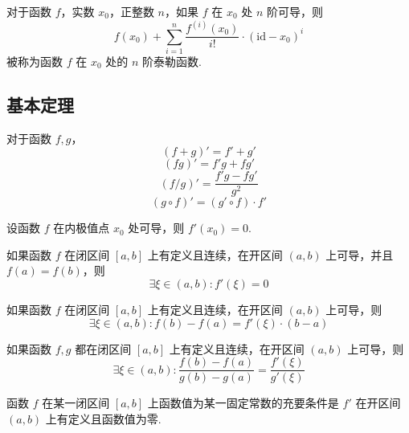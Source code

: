\begin{definition}
    对于函数 $f$，实数 $x_0$，正整数 $n$，如果 $f$ 在 $x_0$ 处 $n$ 阶可导，则
    \[f(x_0) + \sum_{i=1}^{n} \frac{f^{(i)}(x_0)}{i!} \cdot (\mathrm{id} - x_0)^i\]
    被称为函数 $f$ 在 $x_0$ 处的 $n$ 阶泰勒函数.
\end{definition}

\subsection{基本定理}
\begin{theorem}
    对于函数 $f,g$，
    \[(f+g)' = f' + g'\]
    \[(fg)' = f'g + fg'\]
    \[(f/g)' = \frac{f'g - fg'}{g^2}\]
    \[(g \circ f)' = (g'\circ f) \cdot f'\]
\end{theorem}\vspace{9pt}

\begin{theorem}
    设函数 $f$ 在内极值点 $x_0$ 处可导，则 $f'(x_0) = 0$.
\end{theorem}\vspace{9pt}

\begin{subtheorem}
    如果函数 $f$ 在闭区间 $[a,b]$ 上有定义且连续，在开区间 $(a,b)$ 上可导，并且 $f(a) = f(b)$，则
    \[\exists \xi \in (a,b): f'(\xi) = 0\]
\end{subtheorem}

\begin{subtheorem}
    如果函数 $f$ 在闭区间 $[a,b]$ 上有定义且连续，在开区间 $(a,b)$ 上可导，则
    \[\exists \xi \in (a,b): f(b) - f(a) = f'(\xi) \cdot (b-a)\]
\end{subtheorem}

\begin{subtheorem}
    如果函数 $f,g$ 都在闭区间 $[a,b]$ 上有定义且连续，在开区间 $(a,b)$ 上可导，则
    \[\exists \xi \in (a,b): \frac{f(b) - f(a)}{g(b) - g(a)} = \frac{f'(\xi)}{g'(\xi)}\]
\end{subtheorem}\vspace{9pt}

\begin{theorem}
    函数 $f$ 在某一闭区间 $[a,b]$ 上函数值为某一固定常数的充要条件是 $f'$ 在开区间 $(a,b)$ 上有定义且函数值为零.
\end{theorem}